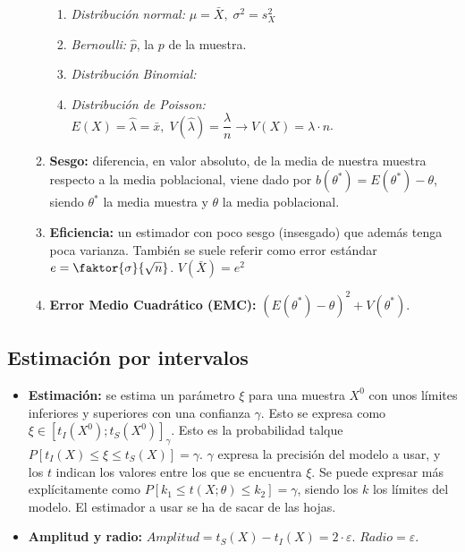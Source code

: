 \documentclass[a4paper, twocolumn, 10pt]{article}
\begin{document}
\begin{itemize}
\begin{enumerate}
		\begin{enumerate}
			\item \textit{Distribución normal:} $\mu = \bar{X}, \; \sigma^2 = s_X^2$
			\item \textit{Bernoulli:} $\hat{p}$, la $p$ de la muestra. 
			\item \textit{Distribución Binomial:}
			\item \textit{Distribución de Poisson:} $E(X) = \hat{\lambda} = \bar{x}, \; V(\hat{\lambda}) = \dfrac{\lambda}{n} \rightarrow V(X) = \lambda\cdot n$.
		\end{enumerate}
		\item \textbf{Sesgo:} diferencia, en valor absoluto, de la media de nuestra muestra respecto a la media poblacional, viene dado por $b(\theta^\ast) = E(\theta^\ast) - \theta$, siendo $\theta^\ast$ la media muestra y $\theta$ la media poblacional.
		\item \textbf{Eficiencia:} un estimador con poco sesgo (insesgado) que además tenga poca varianza. También se suele referir como error estándar $ e= \faktor{\sigma}{\sqrt{n}}$. $V(\bar{X}) = e^2$
		\item \textbf{Error Medio Cuadrático (EMC):} $\left(E(\theta^\ast)-\theta\right)^2 + V(\theta^\ast).$
	\end{enumerate}
\end{itemize}

\subsection{Estimación por intervalos}

\begin{itemize}
	\item \textbf{Estimación:} se estima un parámetro $\xi$ para una muestra $X^0$ con unos límites inferiores y superiores con una confianza $\gamma$. Esto se expresa como $\xi \in \left[t_I(X^0); t_S(X^0)\right]_\gamma$. Esto es la probabilidad talque $P\left[t_I(X)\leq \xi \leq t_S(X)\right] = \gamma$. $\gamma$ expresa la precisión del modelo a usar, y los $t$ indican los valores entre los que se encuentra $\xi$. Se puede expresar más explícitamente como $P\left[k_1\leq t(X;\theta)\leq k_2\right] = \gamma$, siendo los $k$ los límites del modelo. El estimador a usar se ha de sacar de las hojas.
	\item \textbf{Amplitud y radio:} $Amplitud = t_S(X) -t_I(X) = 2\cdot \varepsilon$. $Radio = \varepsilon$.
\end{itemize}
\end{document}
